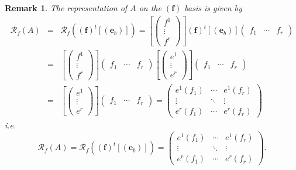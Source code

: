 \documentclass[aps,preprint]{revtex4}
\newtheorem{remark}[theorem]{Remark}
\begin{document}
\begin{remark}
The representation of $A$ on the $\left( \boldsymbol{f}\right) $ basis is
given by 
\begin{eqnarray}
\mathcal{R}_{f}\left( A\right) &=&\mathcal{R}_{f}\left( \overset{}{\left( 
\boldsymbol{f}\right) ^{t}\left[ \left( \boldsymbol{e}_{b}\right) \right] }%
\right) =\left[ \left( 
\begin{array}{c}
f^{1} \\ 
\vdots \\ 
f^{r}%
\end{array}%
\right) \right] \left( \boldsymbol{f}\right) ^{t}\left[ \left( \boldsymbol{e}%
_{b}\right) \right] \left( 
\begin{array}{ccc}
f_{1} & \cdots & f_{r}%
\end{array}%
\right) \\
&=&\left[ \left( 
\begin{array}{c}
f^{1} \\ 
\vdots \\ 
f^{r}%
\end{array}%
\right) \right] \left( 
\begin{array}{ccc}
f_{1} & \cdots & f_{r}%
\end{array}%
\right) \left[ \left( 
\begin{array}{c}
e^{1} \\ 
\vdots \\ 
e^{r}%
\end{array}%
\right) \right] \left( 
\begin{array}{ccc}
f_{1} & \cdots & f_{r}%
\end{array}%
\right) \\
&=&\left[ \left( 
\begin{array}{c}
e^{1} \\ 
\vdots \\ 
e^{r}%
\end{array}%
\right) \right] \left( 
\begin{array}{ccc}
f_{1} & \cdots & f_{r}%
\end{array}%
\right) =\left( 
\begin{array}{ccc}
e^{1}\left( f_{1}\right) & \cdots & e^{1}\left( f_{r}\right) \\ 
\vdots & \ddots & \vdots \\ 
e^{r}\left( f_{1}\right) & \cdots & e^{r}\left( f_{r}\right)%
\end{array}%
\right)
\end{eqnarray}%
i.e. 
\begin{equation}
\mathcal{R}_{f}\left( A\right) =\mathcal{R}_{f}\left( \overset{}{\left( 
\boldsymbol{f}\right) ^{t}\left[ \left( \boldsymbol{e}_{b}\right) \right] }%
\right) =\left( 
\begin{array}{ccc}
e^{1}\left( f_{1}\right) & \cdots & e^{1}\left( f_{r}\right) \\ 
\vdots & \ddots & \vdots \\ 
e^{r}\left( f_{1}\right) & \cdots & e^{r}\left( f_{r}\right)%
\end{array}%
\right) .
\end{equation}
\end{remark}
\end{document}
